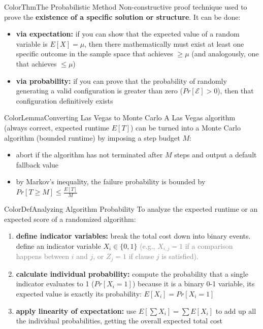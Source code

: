 \documentclass[a4paper, 11pt]{report}
\begin{document}
\begin{cframe}{ColorThm}{The Probabilistic Method}
Non-constructive proof technique used to prove the \textbf{existence of a specific solution or structure}. It can be done:
\begin{itemize}
    \item \textbf{via expectation:} if you can show that the expected value of a random variable is $E[X] = \mu$, then there mathematically must exist at least one specific outcome in the sample space that achieves $\ge \mu$ (and analogously, one that achieves $\le \mu$)
    \item \textbf{via probability:} if you can prove that the probability of randomly generating a valid configuration is greater than zero ($Pr[\mathcal{E}] > 0$), then that configuration definitively exists
\end{itemize}
\end{cframe}

\begin{cframe}{ColorLemma}{Converting Las Vegas to Monte Carlo}
    A Las Vegas algorithm (always correct, expected runtime $E[T]$) can be turned into a Monte Carlo algorithm (bounded runtime) by imposing a step budget $M$:
    \begin{itemize}
        \item abort if the algorithm has not terminated after $M$ steps and output a default fallback value
        \item by Markov's inequality, the failure probability is bounded by $Pr[T \ge M] \le \frac{E[T]}{M}$
    \end{itemize}
\end{cframe}

\begin{cframe}{ColorDef}{Analyzing Algorithm Probability}{}
To analyze the expected runtime or an expected score of a randomized algorithm:
\begin{enumerate}
    \item \textbf{define indicator variables:} break the total cost down into binary events. 
       \subitem define an indicator variable $X_i \in \{0, 1\}$ \textcolor{gray}{(e.g., $X_{i,j} = 1$ if a comparison happens between $i$ and $j$, or $Z_j = 1$ if clause $j$ is satisfied).}
    \item \textbf{calculate individual probability:} compute the probability that a single indicator evaluates to 1 ($Pr[X_i = 1]$)
        \subitem because it is a binary 0-1 variable, its expected value is exactly its probability: $E[X_i] = Pr[X_i = 1]$
    \item \textbf{apply linearity of expectation:} use $E[\sum X_i] = \sum E[X_i]$ to add up all the individual probabilities, getting the overall expected total cost
    \end{enumerate}
    \end{cframe}
\end{document}
